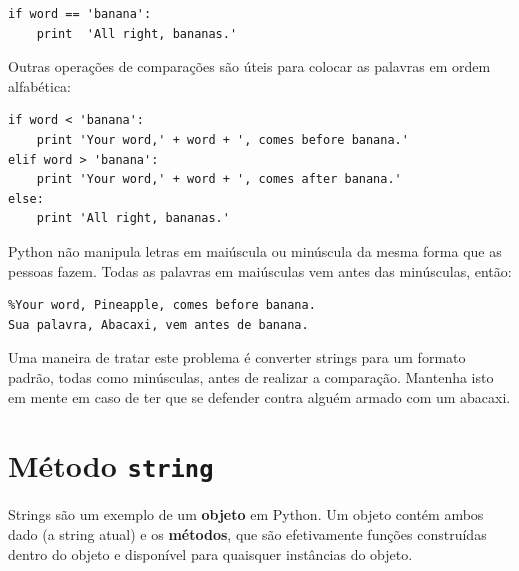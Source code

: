 {\beforeverb
\begin{verbatim}
if word == 'banana':
    print  'All right, bananas.'
\end{verbatim}
\afterverb
%
%
Outras operações de comparações são úteis para colocar as palavras em ordem
alfabética:

\beforeverb
\begin{verbatim}
if word < 'banana':
    print 'Your word,' + word + ', comes before banana.'
elif word > 'banana':
    print 'Your word,' + word + ', comes after banana.'
else:
    print 'All right, bananas.'
\end{verbatim}
\afterverb
%
%
Python não manipula letras em maiúscula ou minúscula da mesma forma que as
pessoas fazem. Todas as palavras em maiúsculas vem antes das minúsculas, então:

\beforeverb
\begin{verbatim}
%Your word, Pineapple, comes before banana.
Sua palavra, Abacaxi, vem antes de banana.
\end{verbatim}
\afterverb
%
%
Uma maneira de tratar este problema é converter strings para um formato
padrão, todas como minúsculas, antes de realizar a comparação. Mantenha isto
em mente em caso de ter que se defender contra alguém armado com um abacaxi.

\section{Método {\tt string}}

Strings são um exemplo de um {\bf objeto} em Python. Um objeto contém ambos
dado (a string atual) e os {\bf métodos}, que são efetivamente funções
construídas dentro do objeto e disponível para quaisquer instâncias do objeto.

}
